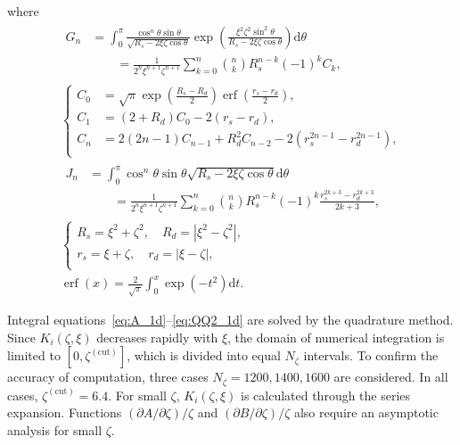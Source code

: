 \documentclass[review]{elsarticle}
\newcommand{\dd}{\mathrm{d}}
\newcommand{\Pder}[2][]{\partial#1/\partial#2}
\DeclareMathOperator{\erf}{erf}
\begin{document}
where
\begin{gather}
    \begin{aligned}
    G_n &= \int_0^\pi \frac{\cos^n\theta \sin\theta}{\sqrt{R_s-2\xi\zeta\cos\theta}}
        \exp\left(\frac{\xi^2\zeta^2\sin^2\theta}{R_s-2\xi\zeta\cos\theta}\right) \dd\theta \\
        &\qquad = \frac1{2^n\xi^{n+1}\zeta^{n+1}} \sum_{k=0}^n {n \choose k} R_s^{n-k} (-1)^k C_k,
    \end{aligned}\\
    \left\{\begin{aligned}
        C_0 &= \sqrt\pi\exp\left(\frac{R_s-R_d}2\right) \erf\left(\frac{r_s-r_d}2\right), \\
        C_1 &= (2+R_d)C_0 - 2(r_s-r_d), \\
        C_n &= 2(2n-1)C_{n-1} + R_d^2C_{n-2} - 2\left(r_s^{2n-1}-r_d^{2n-1}\right), \\
    \end{aligned}\right.\\
    \begin{aligned}
    J_n &= \int_0^\pi \cos^n\theta \sin\theta \sqrt{R_s-2\xi\zeta\cos\theta} \dd\theta \\
        &\qquad = \frac1{2^n\xi^{n+1}\zeta^{n+1}} \sum_{k=0}^n {n \choose k} R_s^{n-k} (-1)^k
        \frac{r_s^{2k+3} - r_d^{2k+3}}{2k+3},
    \end{aligned}\\
    \left\{\begin{gathered}
        R_s = \xi^2 + \zeta^2, \quad R_d = \left|\xi^2 - \zeta^2\right|, \\
        r_s = \xi + \zeta, \quad r_d = \left|\xi - \zeta\right|, \\
    \end{gathered}\right.\\
    \erf(x) = \frac2{\sqrt\pi} \int_0^x \exp(-t^2)\dd{t}.
\end{gather}

Integral equations~\eqref{eq:A_1d}--\eqref{eq:QQ2_1d} are solved by the quadrature method.
Since \(K_i(\zeta,\xi)\) decreases rapidly with \(\xi\),
the domain of numerical integration is limited to \([0,\zeta^{(\mathrm{cut})}]\),
which is divided into equal \(N_\zeta\) intervals.
To confirm the accuracy of computation, three cases \(N_\zeta = 1200, 1400, 1600\)
are considered. In all cases, \(\zeta^{(\mathrm{cut})} = 6.4\).
For small \(\zeta\), \(K_i(\zeta,\xi)\) is calculated through the series expansion.
Functions \((\Pder[A]{\zeta})/\zeta\) and \((\Pder[B]{\zeta})/\zeta\)
also require an asymptotic analysis for small \(\zeta\).
\end{document}
